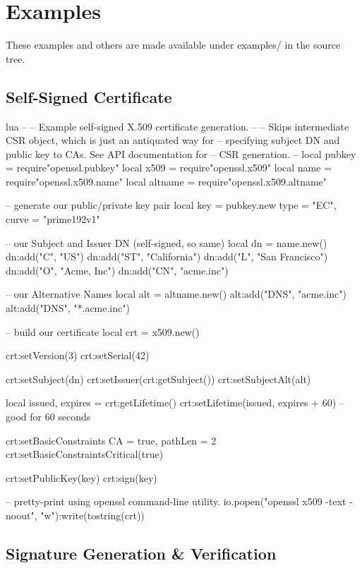 \documentclass[11pt, oneside]{memoir}
\begin{document}
\chapter{Examples}

These examples and others are made available under examples/ in the source tree.

\section{Self-Signed Certificate}

\begin{example}{lua}
--
-- Example self-signed X.509 certificate generation.
--
-- Skips intermediate CSR object, which is just an antiquated way for
-- specifying subject DN and public key to CAs. See API documentation for
-- CSR generation.
--
local pubkey = require"openssl.pubkey"
local x509 = require"openssl.x509"
local name = require"openssl.x509.name"
local altname = require"openssl.x509.altname"

-- generate our public/private key pair
local key = pubkey.new{ type = "EC", curve = "prime192v1" }

-- our Subject and Issuer DN (self-signed, so same)
local dn = name.new()
dn:add("C", "US")
dn:add("ST", "California")
dn:add("L", "San Francisco")
dn:add("O", "Acme, Inc")
dn:add("CN", "acme.inc")

-- our Alternative Names
local alt = altname.new()
alt:add("DNS", "acme.inc")
alt:add("DNS", "*.acme.inc")

-- build our certificate
local crt = x509.new()

crt:setVersion(3)
crt:setSerial(42)

crt:setSubject(dn)
crt:setIssuer(crt:getSubject())
crt:setSubjectAlt(alt)

local issued, expires = crt:getLifetime()
crt:setLifetime(issued, expires + 60) -- good for 60 seconds

crt:setBasicConstraints{ CA = true, pathLen = 2 }
crt:setBasicConstraintsCritical(true)

crt:setPublicKey(key)
crt:sign(key)

-- pretty-print using openssl command-line utility.
io.popen("openssl x509 -text -noout", "w"):write(tostring(crt))


\end{example}


\clearpage

\section{Signature Generation \& Verification}
\end{document}

